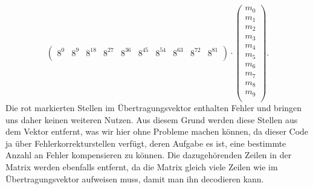 \[\begin{pmatrix}
	8^0&	8^9& 8^{18}& 8^{27}& 8^{36}& 8^{45}& 8^{54}& 8^{63}& 8^{72}& 8^{81}\\
\end{pmatrix}
\cdot
\begin{pmatrix}
	m_0 \\ m_1 \\ m_2 \\ m_3 \\ m_4 \\ m_5 \\ m_6 \\ m_7 \\ m_8 \\ m_9 \\
\end{pmatrix}
.
\]
Die rot markierten Stellen im Übertragungsvektor enthalten Fehler und bringen uns daher keinen weiteren Nutzen. 
Aus diesem Grund werden diese Stellen aus dem Vektor entfernt, was wir hier ohne Probleme machen können, da dieser Code ja über Fehlerkorrekturstellen verfügt, deren Aufgabe es ist, eine bestimmte Anzahl an Fehler kompensieren zu können.
Die dazugehörenden Zeilen in der Matrix werden ebenfalls entfernt, da die Matrix gleich viele Zeilen wie im Übertragungsvektor aufweisen muss, damit man ihn decodieren kann.

